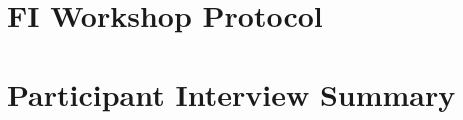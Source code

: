 \clearpage
\appendix
\label{appendix}


\section{FI Workshop Protocol}
\label{protocol}

\clearpage

\section{Participant Interview Summary}
